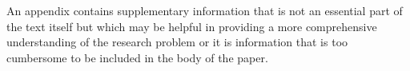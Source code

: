 \documentclass[pdflatex,sn-mathphys-num]{sn-jnl}%
\theoremstyle{thmstyleone}%
\theoremstyle{thmstyletwo}%
\theoremstyle{thmstylethree}%
\begin{document}
\begin{appendices}
An appendix contains supplementary information that is not an essential part of the text itself but which may be helpful in providing a more comprehensive understanding of the research problem or it is information that is too cumbersome to be included in the body of the paper.




\end{appendices}


\end{document}
